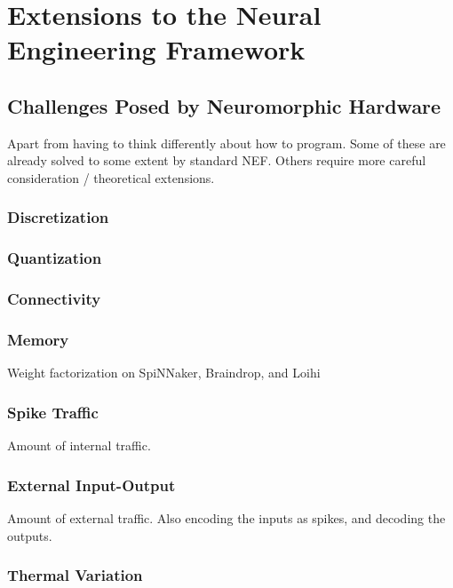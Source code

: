 \chapter{Extensions to the Neural Engineering Framework}
\label{chapt:nef-extensions}


\section{Challenges Posed by Neuromorphic Hardware}
\label{sec:challenges}

Apart from having to think differently about how to program.
Some of these are already solved to some extent by standard NEF. Others require more careful consideration / theoretical extensions.

\subsection{Discretization}

\subsection{Quantization}

\subsection{Connectivity}

\subsection{Memory}

Weight factorization on SpiNNaker, Braindrop, and Loihi

\subsection{Spike Traffic}

Amount of internal traffic.

\subsection{External Input-Output}

Amount of external traffic. Also encoding the inputs as spikes, and decoding the outputs.

\subsection{Thermal Variation}


